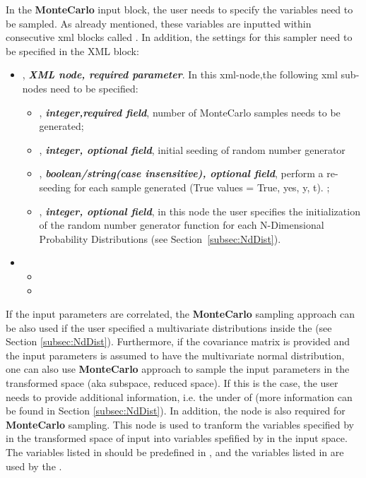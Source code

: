 In the \textbf{MonteCarlo} input block, the user needs to specify the variables need to be sampled. As already mentioned, these variables are inputted within consecutive xml blocks called . In addition, the settings for this sampler need to be specified in the  XML block:
\begin{itemize}
\item {},  \textit{\textbf{XML node, required parameter}}. In this xml-node,the following xml sub-nodes need to be specified:
  \begin{itemize}
    \item {}, \textit{\textbf{integer,required field}}, number of MonteCarlo samples needs to be generated;
    \item {}, \textit{\textbf{integer, optional field}}, initial seeding of random number generator
    \item {},  \textit{\textbf{boolean/string(case insensitive), optional field}}, perform a re-seeding for each sample generated (True values = True, yes, y, t). ;
    \item {},  \textit{\textbf{integer, optional field}}, in this node the user specifies the initialization of the random number generator function for each N-Dimensional Probability Distributions (see Section~\ref{subsec:NdDist}).
  \end{itemize}
\end{itemize}
\begin{itemize}
\item \variableDescription
 \variableChildrenIntro
 \begin{itemize}
    \item \distributionDescription
    \item \functionDescription
  \end{itemize}
\end{itemize}

If the input parameters are correlated, the \textbf{MonteCarlo} sampling approach can be also used if the user specified a
multivariate distributions inside the  (see Section \ref{subsec:NdDist}). Furthermore, if the
covariance matrix is provided and the input parameters is assumed to have the multivariate normal distribution, one can also use
\textbf{MonteCarlo} approach to sample the input parameters in the transformed space (aka subspace, reduced space). If this is
the case, the user needs to provide additional information, i.e. the  under  of
 (more information can be found in Section \ref{subsec:NdDist}). In addition, the node
 is also required for \textbf{MonteCarlo} sampling. This node is used to tranform the variables
specified by  in the transformed space of input into variables spefified by 
in the input space. The variables listed in  should be predefined in , and the variables
listed in  are used by the .

